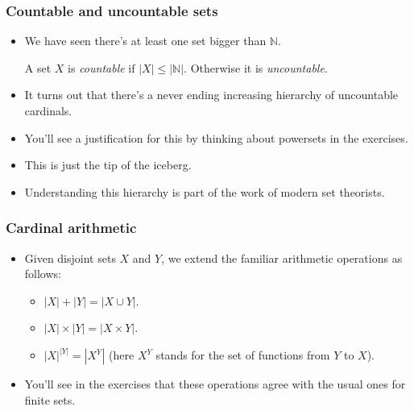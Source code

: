 \documentclass[handout]{beamer}
\newcommand{\bN}{\mathbb{N}}
\begin{document}
\begin{frame}
\frametitle{Countable and uncountable sets}
\begin{itemize} 
\item We have seen there's at least one set bigger than $\bN$.
\vspace{.3cm}
\begin{definition}[countable]
A set $X$ is \emph{countable} if $|X|\leq|\bN|$. Otherwise it is \emph{uncountable}.
\end{definition}
\vspace{.3cm}
\item It turns out that there's a never ending increasing hierarchy of uncountable cardinals. 
\vspace{.3cm}
\item You'll see a justification for this by thinking about powersets in the exercises.
\vspace{.3cm}
\item This is just the tip of the iceberg.
\vspace{.3cm}
\item Understanding this hierarchy is part of the work of modern set theorists.
\end{itemize}
\end{frame}

\begin{frame}
\frametitle{Cardinal arithmetic}
\begin{itemize} 
\item Given disjoint sets $X$ and $Y$, we extend the familiar arithmetic operations as follows:
\vspace{.3cm}
\begin{itemize}
\item $|X|+|Y|=|X\cup Y|$.
\vspace{.3cm}
\item $|X|\times |Y| = |X\times Y|$.
\vspace{.3cm}
\item $|X|^{|Y|} = |X^Y|$ (here $X^Y$ stands for the set of functions from $Y$ to $X$).
\end{itemize}
\vspace{.3cm}
\item You'll see in the exercises that these operations agree with the usual ones for finite sets.
\end{itemize}
\end{frame}
\end{document}
